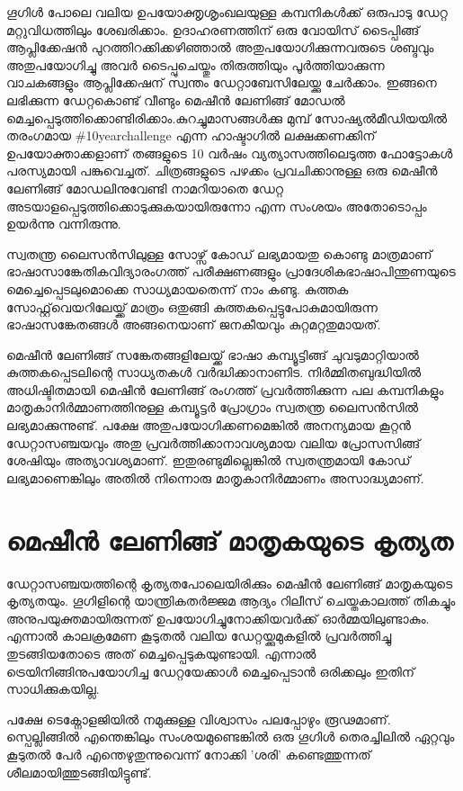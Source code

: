 \documentclass[12pt,twoside,a4paper]{article}
\begin{document}
ഗൂഗിൾ പോലെ വലിയ ഉപയോക്തൃശൃംഖലയുള്ള‌ കമ്പനികൾക്ക് ഒരുപാടു ഡേറ്റ മറ്റുവിധത്തിലും ശേഖരിക്കാം. ഉദാഹരണത്തിന് ഒരു വോയിസ് ടൈപ്പിങ്ങ് ആപ്ലിക്കേഷൻ പുറത്തിറക്കിക്കഴിഞ്ഞാൽ അതുപയോഗിക്കുന്നവരുടെ ശബ്ദവും അതുപയോഗിച്ചു അവർ ടൈപ്പുചെയ്തും തിരുത്തിയും പൂർത്തിയാക്കുന്ന വാചകങ്ങളും ആപ്ലിക്കേഷന് സ്വന്തം ഡേറ്റാബേസിലേയ്ക്കു ചേർക്കാം. ഇങ്ങനെ ലഭിക്കുന്ന ഡേറ്റകൊണ്ട് വീണ്ടും മെഷീൻ ലേണിങ്ങ് മോഡൽ മെച്ചപ്പെടുത്തിക്കൊണ്ടിരിക്കാം.കുറച്ചുമാസങ്ങൾക്കു മുമ്പ് സോഷ്യൽമീഡിയയിൽ തരംഗമായ \#10yearchallenge എന്ന ഹാഷ്ടാഗിൽ ലക്ഷക്കണക്കിന് ഉപയോക്താക്കളാണ് തങ്ങളുടെ 10 വർഷം വ്യത്യാസത്തിലെടുത്ത ഫോട്ടോകൾ പരസ്യമായി പങ്കുവെച്ചത്. ചിത്രങ്ങളുടെ പഴക്കം പ്രവചിക്കാനുള്ള ഒരു മെഷീൻ ലേണിങ്ങ് മോഡലിനുവേണ്ടി നാമറിയാതെ ഡേറ്റ അടയാളപ്പെടുത്തിക്കൊടുക്കുകയായിരുന്നോ എന്ന സംശയം അതോടൊപ്പം ഉയർന്നു വന്നിരുന്നു.


സ്വതന്ത്ര ലൈസൻസിലുള്ള സോഴ്സ് കോഡ് ലഭ്യമായതു കൊണ്ടു മാത്രമാണ് ഭാഷാസാങ്കേതികവിദ്യാരംഗത്ത് പരീക്ഷണങ്ങളും പ്രാദേശികഭാഷാപിന്തുണയുടെ മെച്ചെപ്പെടലുമൊക്കെ സാധ്യമായതെന്ന് നാം കണ്ടു. കുത്തക സോഫ്റ്റ്‌വെയറിലേയ്ക്ക് മാത്രം ഒതുങ്ങി കുത്തകപ്പെട്ടുപോകുമായിരുന്ന ഭാഷാസങ്കേതങ്ങൾ അങ്ങനെയാണ് ജനകീയവും കുറ്റമറ്റതുമായത്.

മെഷീൻ ലേണിങ്ങ് സങ്കേതങ്ങളിലേയ്ക്ക് ഭാഷാ കമ്പ്യൂട്ടിങ്ങ് ചുവടുമാറ്റിയാൽ കുത്തകപ്പെടലിന്റെ സാധ്യതകൾ വർദ്ധിക്കാനാണിട. നിർമ്മിതബുദ്ധിയിൽ അധിഷ്ടിതമായി മെഷീൻ ലേണിങ്ങ് രംഗത്ത് പ്രവർത്തിക്കുന്ന പല കമ്പനികളും മാതൃകാനിർമ്മാണത്തിനുള്ള കമ്പ്യൂട്ടർ പ്രോഗ്രാം സ്വതന്ത്ര ലൈസൻസിൽ ലഭ്യമാക്കുന്നുണ്ട്. പക്ഷേ അതുപയോഗിക്കണമെങ്കിൽ അനന്യമായ കൂറ്റൻ ഡേറ്റാസഞ്ചയവും അതു പ്രവർത്തിക്കാനാവശ്യമായ വലിയ പ്രോസസിങ്ങ് ശേഷിയും അത്യാവശ്യമാണ്. ഇതുരണ്ടുമില്ലെങ്കിൽ സ്വതന്ത്രമായി കോഡ് ലഭ്യമാണെങ്കിലും അതിൽ നിന്നൊരു മാതൃകാനിർമ്മാണം അസാദ്ധ്യമാണ്.


\section{മെഷീൻ ലേണിങ്ങ് മാതൃകയുടെ കൃത്യത}

ഡേറ്റാസഞ്ചയത്തിന്റെ കൃത്യതപോലെയിരിക്കും  മെഷീൻ ലേണിങ്ങ് മാതൃകയുടെ കൃത്യതയും. ഗൂഗിളിന്റെ യാന്ത്രികതർജ്ജമ ആദ്യം റിലീസ് ചെയ്തകാലത്ത് തികച്ചും അനുപയുക്തമായിരുന്നത് ഉപയോഗിച്ചുനോക്കിയവർക്ക് ഓർമ്മയിലുണ്ടാകും. എന്നാൽ കാലക്രമേണ കൂടുതൽ വലിയ ഡേറ്റയ്ക്കുമുകളിൽ പ്രവർത്തിച്ചു തുടങ്ങിയതോടെ അത് മെച്ചപ്പെടുകയുണ്ടായി. എന്നാൽ ട്രെയിനിങ്ങിനുപയോഗിച്ച ഡേറ്റയേക്കാൾ മെച്ചപ്പെടാൻ ഒരിക്കലും ഇതിന് സാധിക്കുകയില്ല.

പക്ഷേ ടെക്നോളജിയിൽ നമുക്കുള്ള വിശ്വാസം പലപ്പോഴും രൂഢമാണ്. സ്പെല്ലിങ്ങിൽ എന്തെങ്കിലും സംശയമുണ്ടെങ്കിൽ ഒരു ഗൂഗിൾ തെരച്ചിലിൽ ഏറ്റവും കൂടുതൽ പേർ എന്തെഴുതുന്നുവെന്ന് നോക്കി 'ശരി' കണ്ടെത്തുന്നത് ശീലമായിത്തുടങ്ങിയിട്ടുണ്ട്.
\end{document}
